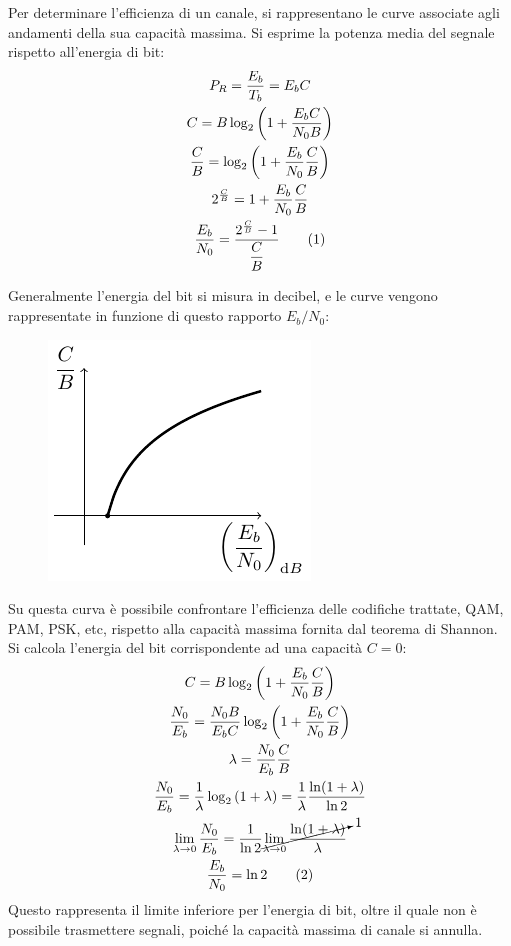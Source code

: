\documentclass{article}
\newcommand{\tageq}{\tag{\stepcounter{equation}\theequation}}
\numberwithin{equation}{subsection}
\begin{document}
Per determinare l'efficienza di un canale, si rappresentano le curve associate agli andamenti della sua capacità massima. Si esprime la potenza media del segnale 
rispetto all'energia di bit:
\begin{gather*}
    P_R=\displaystyle\frac{E_b}{T_b}=E_bC\\
    C=B\log_2\left(\displaystyle 1+\frac{E_bC}{N_0B}\right)\\
    \displaystyle\frac{C}{B}=\log_2\left(1+\frac{E_b}{N_0}\frac{C}{B}\right)\\
    2^{\frac{C}{B}}=1+\displaystyle\frac{E_b}{N_0}\frac{C}{B}\\
    \displaystyle\frac{E_b}{N_0}=\frac{2^{\frac{C}{B}}-1}{\displaystyle\frac{C}{B}}\tageq
\end{gather*}

Generalmente l'energia del bit si misura in decibel, e le curve vengono rappresentate in funzione di questo rapporto $E_b/N_0$:
\begin{figure}[H]%
    \centering
    \includegraphics{shannon.pdf}
\end{figure}
Su questa curva è possibile confrontare l'efficienza delle codifiche trattate, QAM, PAM, PSK, etc, rispetto alla capacità massima fornita dal teorema di Shannon. 
Si calcola l'energia del bit corrispondente ad una capacità $C=0$:
\begin{gather*}
    C=B\log_2\left(\displaystyle 1+\frac{E_b}{N_0}\frac{C}{B}\right)\\
    \displaystyle\frac{N_0}{E_b}=\frac{N_0B}{E_bC}\log_2\left(1+\frac{E_b}{N_0}\frac{C}{B}\right)\\
    \lambda=\displaystyle\frac{N_0}{E_b}\frac{C}{B}\\
    \displaystyle\frac{N_0}{E_b}=\frac{1}{\lambda}\log_2\left(1+\lambda\right)=\frac{1}{\lambda}\frac{\ln(1+\lambda)}{\ln2}\\
    \lim_{\lambda\to0}\displaystyle\frac{N_0}{E_b}=\frac{1}{\ln2}\cancelto{1}{\lim_{\lambda\to0}\frac{\ln(1+\lambda)}{\lambda}}\\
    \displaystyle\frac{E_b}{N_0}=\ln2\tageq
\end{gather*}
Questo rappresenta il limite inferiore per l'energia di bit, oltre il quale non è possibile trasmettere segnali, poiché la capacità massima di canale si annulla.  
\end{document}
